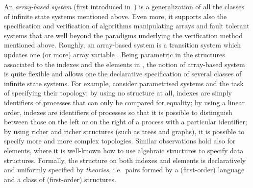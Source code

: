 \documentclass{LMCS}
\theoremstyle{plain}\newtheorem{assumption}[thm]{Assumption}
\theoremstyle{plain}\newtheorem{proposition}[thm]{Proposition}
\theoremstyle{plain}\newtheorem{property}[thm]{Property}
\theoremstyle{plain}\newtheorem{example}[thm]{Example}
\theoremstyle{plain}\newtheorem{claim}[thm]{Claim}
\theoremstyle{plain}\newtheorem{lemma}[thm]{Lemma}
\begin{document}
An \emph{array-based system} (first introduced in~\cite{ijcar08}) is a
generalization of all the classes of infinite state systems mentioned
above.  Even more, it supports also the specification and verification
of algorithms manipulating arrays and fault tolerant systems that are
well beyond the paradigms underlying the verification method mentioned
above.  Roughly, an array-based system is a transition system which
updates one (or more) array variable .  Being parametric
in the structures associated to the indexes and the elements in
, the notion of array-based system is quite flexible and
allows one the declarative specification of several classes of
infinite state systems.  For example, consider parametrised systems
and the task of specifying their topology: by using no structure at
all, indexes are simply identifiers of processes that can only be
compared for equality; by using a linear order, indexes are
identifiers of processes so that it is possible to distinguish between
those on the left or on the right of a process with a particular
identifier; by using richer and richer structures (such as trees and
graphs), it is possible to specify more and more complex
topologies. Similar observations hold also for elements, where it is
well-known how to use algebraic structures to specify data structures.
Formally, the structure on both indexes and elements is declaratively
and uniformly specified by \emph{theories}, i.e.\ pairs formed by a
(first-order) language and a class of (first-order) structures.
\end{document}
